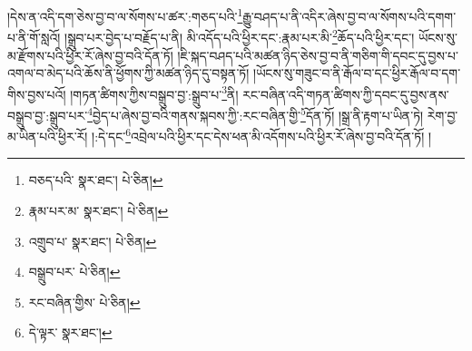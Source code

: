 །དེས་ན་འདི་དག་ཅེས་བྱ་བ་ལ་སོགས་པ་ཚར་:གཅད་པའི་\footnote{བཅད་པའི་  སྣར་ཐང་།  པེ་ཅིན། }རྒྱུ་བཤད་པ་ནི་འདིར་ཞེས་བྱ་བ་ལ་སོགས་པའི་དགག་པ་ནི་གོ་སླའོ། །སྒྲུབ་པར་བྱེད་པ་བརྗོད་པ་ནི། མི་འདོད་པའི་ཕྱིར་དང་:རྣམ་པར་མི་\footnote{རྣམ་པར་མ་  སྣར་ཐང་།  པེ་ཅིན། }ཆོད་པའི་ཕྱིར་དང་། ཡོངས་སུ་མ་རྫོགས་པའི་ཕྱིར་རོ་ཞེས་བྱ་བའི་དོན་ཏོ། །ཇི་སྐད་བཤད་པའི་མཚན་ཉིད་ཅེས་བྱ་བ་ནི་གཅིག་གི་དབང་དུ་བྱས་པ་འགལ་བ་མེད་པའི་ཆོས་ནི་ཕྱོགས་ཀྱི་མཚན་ཉིད་དུ་བསྟན་ཏོ། །ཡོངས་སུ་གཟུང་བ་ནི་རྒོལ་བ་དང་ཕྱིར་རྒོལ་བ་དག་གིས་བྱས་པའོ། །གཏན་ཚིགས་ཀྱིས་བསྒྲུབ་བྱ་:སྒྲུབ་པ་\footnote{འགྲུབ་པ་  སྣར་ཐང་།  པེ་ཅིན། }ནི། རང་བཞིན་འདི་གཏན་ཚིགས་ཀྱི་དབང་དུ་བྱས་ནས་བསྒྲུབ་བྱ་:སྒྲུབ་པར་\footnote{བསྒྲུབ་པར་  པེ་ཅིན། }བྱེད་པ་ཞེས་བྱ་བའི་གནས་སྐབས་ཀྱི་:རང་བཞིན་གྱི་\footnote{རང་བཞིན་གྱིས་  པེ་ཅིན། }དོན་ཏོ། །སྒྲ་ནི་རྟག་པ་ཡིན་ཏེ། རེག་བྱ་མ་ཡིན་པའི་ཕྱིར་རོ། །:དེ་དང་\footnote{དེ་ལྟར་  སྣར་ཐང་། }འབྲེལ་པའི་ཕྱིར་དང་དེས་ཕན་མི་འདོགས་པའི་ཕྱིར་རོ་ཞེས་བྱ་བའི་དོན་ཏོ། །
